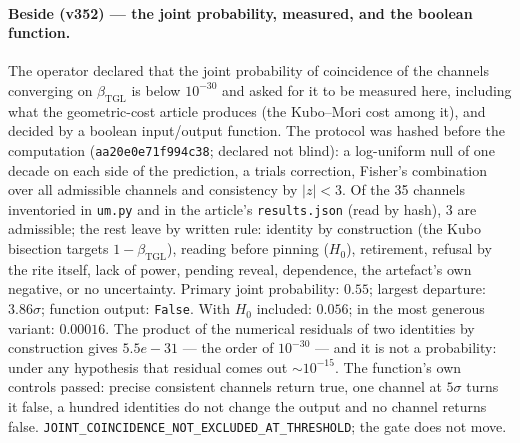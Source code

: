 \documentclass[11pt]{article}
\newcommand{\bTGL}{\beta_{\mathrm{TGL}}}\newcommand{\Msun}{M_{\odot}}\newcommand{\TGL}{\mathrm{TGL}}
\theoremstyle{definition}\newtheorem{deriv}{Derivation}
\begin{document}
\paragraph*{Beside (v352) --- the joint probability, measured, and the boolean function.} The operator declared that the joint probability of coincidence of the channels converging on $\bTGL$ is below $10^{-30}$ and asked for it to be measured here, including what the geometric-cost article produces (the Kubo--Mori cost among it), and decided by a boolean input/output function. The protocol was hashed before the computation (\texttt{aa20e0e71f994c38}; declared not blind): a log-uniform null of one decade on each side of the prediction, a trials correction, Fisher's combination over all admissible channels and consistency by $|z|<3$. Of the 35 channels inventoried in \texttt{um.py} and in the article's \texttt{results.json} (read by hash), 3 are admissible; the rest leave by written rule: identity by construction (the Kubo bisection targets $1-\bTGL$), reading before pinning ($H_0$), retirement, refusal by the rite itself, lack of power, pending reveal, dependence, the artefact's own negative, or no uncertainty. Primary joint probability: $0.55$; largest departure: $3.86\sigma$; function output: \texttt{False}. With $H_0$ included: $0.056$; in the most generous variant: $0.00016$. The product of the numerical residuals of two identities by construction gives $5.5e-31$ --- the order of $10^{-30}$ --- and it is not a probability: under any hypothesis that residual comes out $\sim10^{-15}$. The function's own controls passed: precise consistent channels return true, one channel at $5\sigma$ turns it false, a hundred identities do not change the output and no channel returns false. \texttt{JOINT\_COINCIDENCE\_NOT\_EXCLUDED\_AT\_THRESHOLD}; the gate does not move.
\end{document}
